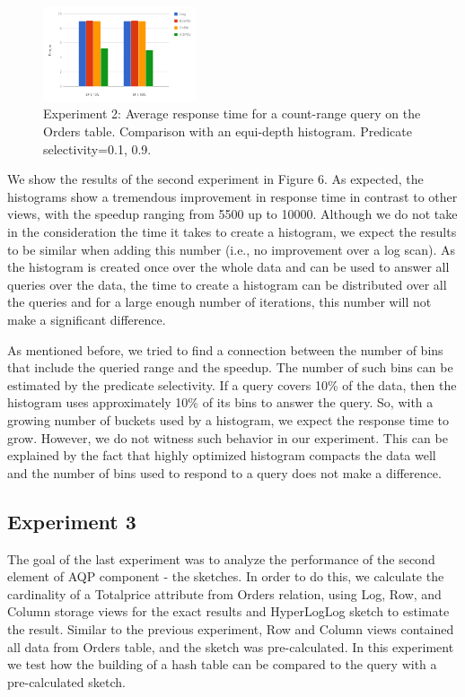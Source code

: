 \documentclass[10pt, conference, compsocconf]{IEEEtran}
\begin{document}
\begin{figure} \includegraphics[width=0.4\textwidth, center]{img/exp2.png} 
\caption{Experiment 2: Average response time for a count-range query on the Orders table. Comparison with an equi-depth histogram. Predicate selectivity=0.1, 0.9.}
\end{figure}

We show the results of the second experiment in Figure 6. As expected, the histograms show a tremendous improvement in response time in contrast to other views, with the speedup ranging from 5500 up to 10000. Although we do not take in the consideration the time it takes to create a histogram, we expect the results to be similar when adding this number (i.e., no improvement over a log scan). As the histogram is created once over the whole data and can be used to answer all queries over the data, the time to create a histogram can be distributed over all the queries and for a large enough number of iterations, this number will not make a significant difference.

As mentioned before, we tried to find a connection between the number of bins that include the queried range and the speedup. The number of such bins can be estimated by the predicate selectivity. If a query covers 10\% of the data, then the histogram uses approximately 10\% of its bins to answer the query. So, with a growing number of buckets used by a histogram, we expect the response time to grow. However, we do not witness such behavior in our experiment. This can be explained by the fact that highly optimized histogram compacts the data well and the number of bins used to respond to a query does not make a difference.

\subsection{Experiment 3}
The goal of the last experiment was to analyze the performance of the second element of AQP component - the sketches. In order to do this, we calculate the cardinality of a Totalprice attribute from Orders relation, using Log, Row, and Column storage views for the exact results and HyperLogLog sketch to estimate the result. Similar to the previous experiment, Row and Column views contained all data from Orders table, and the sketch was pre-calculated. In this experiment we test how the building of a hash table can be compared to the query with a pre-calculated sketch.
\end{document}
